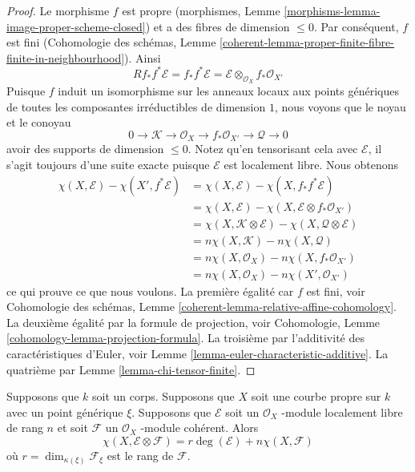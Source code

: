 \begin{proof}
Le morphisme $f$ est propre (morphismes,
Lemme
\ref{morphisms-lemma-image-proper-scheme-closed}) et a
des fibres de dimension $\leq 0$. Par conséquent, $f$
est fini (Cohomologie des schémas, Lemme
\ref{coherent-lemma-proper-finite-fibre-finite-in-neighbourhood}). Ainsi
$$
Rf_*f^*\mathcal{E} = f_*f^*\mathcal{E} =
\mathcal{E} \otimes_{\mathcal{O}_X} f_*\mathcal{O}_{X'}
$$
Puisque $f$ induit un isomorphisme sur les anneaux locaux
aux points génériques de toutes les composantes
irréductibles de dimension $1$, nous voyons que le noyau et le conoyau
$$
0 \to \mathcal{K} \to \mathcal{O}_X \to f_*\mathcal{O}_{X'}
\to \mathcal{Q} \to 0
$$
avoir des supports de dimension $\leq 0$. Notez qu’en
tensorisant cela avec $\mathcal{E}$, il s’agit toujours d’une
suite exacte puisque $\mathcal{E}$ est localement libre. Nous obtenons
\begin{align*}
\chi(X, \mathcal{E}) - \chi(X', f^*\mathcal{E})
& =
\chi(X, \mathcal{E}) - \chi(X, f_*f^*\mathcal{E}) \\
& =
\chi(X, \mathcal{E}) - \chi(X, \mathcal{E} \otimes f_*\mathcal{O}_{X'}) \\
& =
\chi(X, \mathcal{K} \otimes \mathcal{E}) -
\chi(X, \mathcal{Q} \otimes \mathcal{E}) \\
& =
n\chi(X, \mathcal{K}) -
n\chi(X, \mathcal{Q}) \\
& =
n\chi(X, \mathcal{O}_X) - n\chi(X, f_*\mathcal{O}_{X'}) \\
& =
n\chi(X, \mathcal{O}_X) - n\chi(X', \mathcal{O}_{X'})
\end{align*}
ce qui prouve ce que nous voulons. La première égalité car $f$
est fini, voir Cohomologie des schémas, Lemme
\ref{coherent-lemma-relative-affine-cohomology}. La deuxième
égalité par la formule de projection, voir Cohomologie, Lemme
\ref{cohomology-lemma-projection-formula}. La troisième par
l'additivité des caractéristiques d'Euler, voir Lemme
\ref{lemma-euler-characteristic-additive}. La quatrième par Lemme \ref{lemma-chi-tensor-finite}.
\end{proof}

\begin{lemma}
\label{lemma-degree-on-proper-curve}
Supposons que $k$ soit un corps. Supposons que $X$ soit une courbe propre sur $k$ avec un
point générique $\xi$. Supposons que $\mathcal{E}$ soit un $\mathcal{O}_X$ -module
localement libre de rang $n$ et soit $\mathcal{F}$ un $\mathcal{O}_X$ -module cohérent. Alors
$$
\chi(X, \mathcal{E} \otimes \mathcal{F}) =
r \deg(\mathcal{E}) + n \chi(X, \mathcal{F})
$$
où $r = \dim_{\kappa(\xi)} \mathcal{F}_\xi$ est le rang de $\mathcal{F}$.
\end{lemma}

